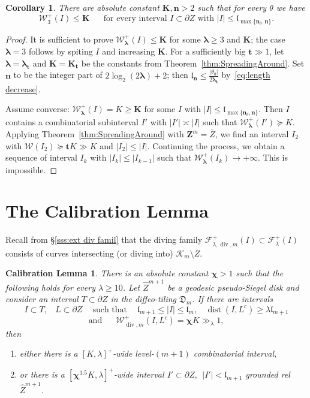 \documentclass{amsart}
\renewcommand{\sp}{{\ \ }}
\newcommand{\1}{{\mathbb 1 }}
\newcommand{\blambda}{{\boldsymbol\lambda}}
\renewcommand{\div}{{\operatorname{div}}}
\newcommand{\Fam}{{\mathcal F}}
\newcommand{\Width}{{\mathcal W}}
\newcommand{\wZ}{{\widehat Z}}
\newcommand{\bZ}{{\mathbf Z}}
\newcommand{\bK}{{\mathbf K}}
\newcommand{\bbn}{{\mathbf n}}
\newcommand{\bbt}{{\mathbf t}}
\newcommand{\length}{{\mathfrak l}}
\newcommand{\Dbb}{{\mathfrak{D}}}
\newtheorem{cor}[thm]{Corollary}
\newtheorem{caliblem}[thm]{Calibration Lemma}
\theoremstyle{remark}
\numberwithin{equation}{section}
\theoremstyle{definition}
\newcommand{\filled}{{\mathcal {K} }}
\newcommand{\dist}{\operatorname{dist}}
\newcommand{\bchi}{{\boldsymbol{ \chi}}}
\begin{document}
\begin{cor}
\label{cor:bds:deep case}
There are absolute constant $\bK,\bbn>2$ such that for every $\theta$ we have
\[\Width^+_3(I)\le \bK \sp\sp\sp\text{ for every interval }I\subset \partial Z \text{ with }|I|\le \length_{\max\{\bbn_\theta, \bbn\}} .\]
\end{cor}
\begin{proof}
It is sufficient to prove $\Width^+_{\blambda} (I)\le \bK$ for some $\blambda\ge 3$ and $\bK$; the case $\blambda=3$ follows by spiting $I$ and increasing $\bK$. For a sufficiently big $\bbt\gg 1$, let $\blambda=\blambda_\bbt$ and $\bK=\bK_\bbt$ be the constants from Theorem~\ref{thm:SpreadingAround}. Set $\bbn$ to be the integer part of $ 2 \log_2 (2\blambda)+2$; then $\length_\bbn \le \frac{|\theta_0|}{2\blambda _\bbt}$ by~\eqref{eq:length decrease}. 


Assume converse: $\Width^+_\blambda(I)=K\ge \bK$ for some $I$ with $|I|\le \length_{\max\{\bbn_\theta, \bbn\}}$. Then $I$ contains a combinatorial subinterval $I'$ with $|I'|\asymp |I|$ such that $\Width^+_\blambda(I')\succeq K$. Applying Theorem~\ref{thm:SpreadingAround} with $\bZ^m= \overline Z$, we find an interval $I_2$ with $\Width(I_2) \succeq \bbt K\gg K$ and $|I_2|\le |I|$. Continuing the process,  we obtain a sequence of interval $I_k$ with $|I_k|\le |I_{k-1}|$ such that $\Width^+_{\blambda}(I_k)\to +\infty$. This is impossible.
\end{proof}




\section{The Calibration Lemma} \label{s:CalibrLmm}Recall from \S\ref{sss:ext div famil}  that the diving family $\Fam^+_{\lambda, \div, m}(I)\subset \Fam^+_{\lambda}(I)$ consists of curves intersecting (or diving into) $\filled_m\setminus \overline Z$.

\begin{caliblem}
\label{lmm:CalibrLmm}
There is an absolute constant $\bchi> 1$ such that the following holds for every $\lambda\ge 10$. Let $\wZ^{m+1}$ be a geodesic pseudo-Siegel disk and consider an interval $T\subset\partial Z$ in the diffeo-tiling $\Dbb_m$. If there are intervals \[I\subset T,\sp\sp L\subset \partial Z \sp\sp \text{ such that }\sp\sp \length_{m+1} \le |I|\le \length_{m},\sp\sp \dist(I,L^c)\ge \lambda \length
_{m+1} \]
\[\text{and }\sp\sp\sp \Width^+_{\div, m}(I, L^c) = \bchi K\gg_\lambda 1,\] then 
\begin{enumerate}[label=\text{(\Roman*)},font=\normalfont,leftmargin=*]
\item \label{Cal:Lmm:Concl:1} either there is a $[K,\lambda]^+$-wide level-$(m+1)$ combinatorial interval,
\item \label{Cal:Lmm:Concl:2} or there is a $[\bchi^{1.5} K,\lambda]^+$-wide interval $I'\subset \partial Z,\sp |I'|<\length_{m+1}$ grounded rel $\wZ^{m+1}$.
\end{enumerate}
\end{caliblem}
\end{document}
